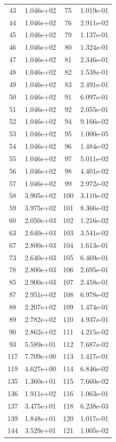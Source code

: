\documentclass[12pt]{article}
\begin{document}
\begin{longtable}{@{}cccc@{}}
43 & 1.046e+02 & 75 & 1.019e-01 \\
44 & 1.046e+02 & 76 & 2.911e-02 \\
45 & 1.046e+02 & 79 & 1.137e-01 \\
46 & 1.046e+02 & 80 & 1.324e-01 \\
47 & 1.046e+02 & 81 & 2.346e-01 \\
48 & 1.046e+02 & 82 & 1.538e-01 \\
49 & 1.046e+02 & 83 & 2.491e-01 \\
50 & 1.046e+02 & 91 & 6.097e-01 \\
51 & 1.046e+02 & 92 & 2.055e-01 \\
52 & 1.046e+02 & 94 & 9.166e-02 \\
53 & 1.046e+02 & 95 & 1.000e-05 \\
54 & 1.046e+02 & 96 & 1.484e-02 \\
55 & 1.046e+02 & 97 & 5.011e-02 \\
56 & 1.046e+02 & 98 & 4.401e-02 \\
57 & 1.046e+02 & 99 & 2.972e-02 \\
58 & 3.905e+02 & 100 & 3.110e-02 \\
59 & 3.975e+02 & 101 & 8.366e-02 \\
60 & 2.050e+03 & 102 & 1.216e-02 \\
63 & 2.640e+03 & 103 & 3.541e-02 \\
67 & 2.800e+03 & 104 & 1.613e-01 \\
73 & 2.640e+03 & 105 & 6.469e-01 \\
78 & 2.800e+03 & 106 & 2.695e-01 \\
85 & 2.900e+03 & 107 & 2.458e-01 \\
87 & 2.951e+02 & 108 & 6.978e-02 \\
88 & 2.207e+02 & 109 & 1.474e-01 \\
89 & 2.782e+02 & 110 & 4.937e-01 \\
90 & 2.862e+02 & 111 & 4.215e-02 \\
93 & 5.589e+01 & 112 & 7.687e-02 \\
117 & 7.709e+00 & 113 & 1.417e-01 \\
119 & 4.627e+00 & 114 & 6.846e-02 \\
135 & 1.360e+01 & 115 & 7.660e-02 \\
136 & 1.911e+02 & 116 & 1.063e-01 \\
137 & 3.475e+01 & 118 & 6.238e-03 \\
139 & 1.848e+01 & 120 & 1.017e-01 \\
144 & 3.529e+01 & 121 & 1.005e-02 \\

\end{longtable}
\end{document}
